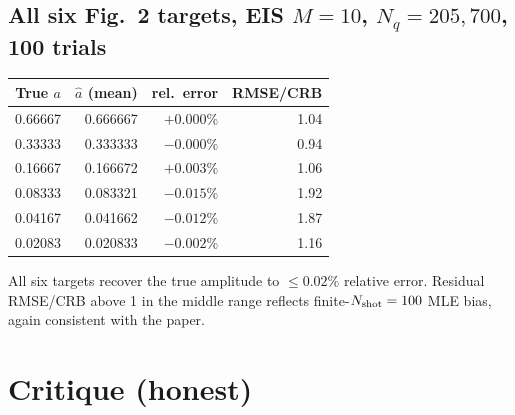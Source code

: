 \documentclass[11pt]{article}
\begin{document}
\subsection{All six Fig.\ 2 targets, EIS $M=10$, $N_q=205{,}700$, 100 trials}

\begin{center}
\begin{tabular}{rrrr}
\toprule
True $a$ & $\hat a$ (mean) & rel.\ error & RMSE/CRB \\
\midrule
0.66667 & 0.666667 & $+0.000\%$  & 1.04 \\
0.33333 & 0.333333 & $-0.000\%$  & 0.94 \\
0.16667 & 0.166672 & $+0.003\%$  & 1.06 \\
0.08333 & 0.083321 & $-0.015\%$  & 1.92 \\
0.04167 & 0.041662 & $-0.012\%$  & 1.87 \\
0.02083 & 0.020833 & $-0.002\%$  & 1.16 \\
\bottomrule
\end{tabular}
\end{center}

All six targets recover the true amplitude to $\leq 0.02\%$ relative error.
Residual RMSE/CRB above 1 in the middle range reflects finite-$N_{\rm shot}=100$
MLE bias, again consistent with the paper.

\section{Critique (honest)}
\end{document}
